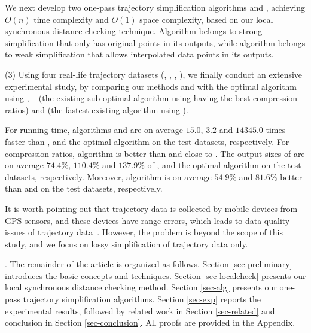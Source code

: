 
 We next develop two one-pass trajectory simplification algorithms \cist and \cista, achieving $O(n)$ time complexity and $O(1)$ space complexity, based on our local synchronous distance checking technique.
Algorithm \cist belongs to strong simplification that only has original points in its outputs, while algorithm \cista belongs to weak simplification that allows interpolated data points in its outputs.


\sstab (3) Using four real-life trajectory datasets (\sercar, \geolife, \mopsi, \pricar),
we finally conduct an extensive experimental study, by comparing our methods \cist and \cista  with the optimal \lsa algorithm using \sed, \dps~\cite{Meratnia:Spatiotemporal} (the existing sub-optimal \lsa algorithm using \sed having the best compression ratios) and \squishe \cite{Muckell:Compression} (the fastest existing \lsa algorithm using \sed).

For running time,
algorithms \cist and \cista are on average $15.0$, $3.2$ and $14345.0$ times faster than \dps, \squishe and the optimal \lsa algorithm on the test datasets, respectively.
%
For compression ratios, algorithm \cist is better than \squishe and close to \dps. The output sizes of \cist are on average $74.4\%$, $110.4\%$ and $137.9\%$ of \squishe, \dps and the optimal \lsa algorithm on the test datasets, respectively.
Moreover, algorithm \cista is on average $54.9\%$ and $81.6\%$ better than \squishe and \dps on the test datasets, respectively.

It is worth pointing out that trajectory data is collected by mobile devices from GPS sensors, and these devices have range errors, which leads to data quality issues of  trajectory data~\cite{PfoserJ99,ZufleTPRRLDE17}. However, the problem is beyond the scope of this study, and we focus on lossy simplification of trajectory data only.


.
The remainder of the article is organized as follows.
Section \ref{sec-preliminary} introduces the basic concepts and techniques.
Section \ref{sec-localcheck} presents our local synchronous distance checking method.
Section \ref{sec-alg} presents our one-pass trajectory simplification algorithms.
Section \ref{sec-exp} reports the experimental results, followed by related work in
Section \ref{sec-related} and conclusion in Section \ref{sec-conclusion}.
All proofs are provided in the Appendix.





